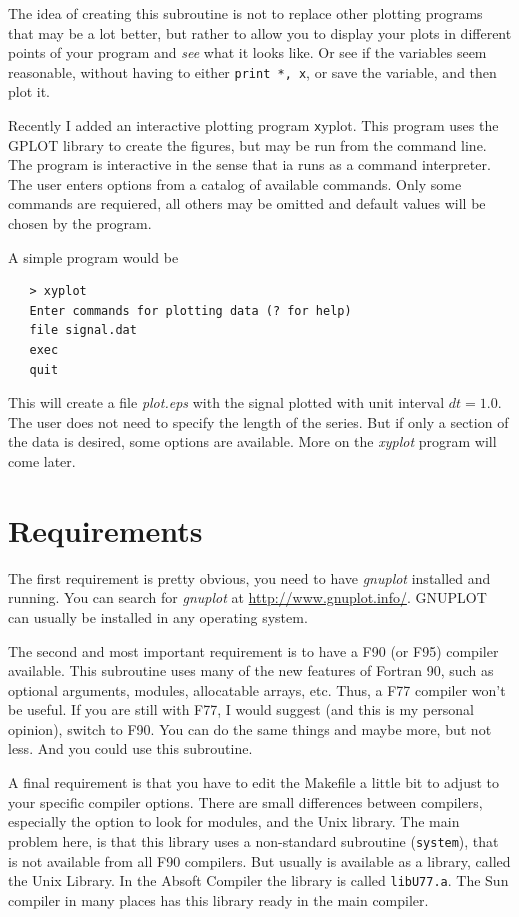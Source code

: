 \documentclass{article}
\begin{document}
The idea of creating this subroutine is not to replace other plotting programs that may be a lot better, but rather to allow you to display your plots in different points of your program and {\it see} what it looks like. Or see if the variables seem reasonable, without having to either \texttt{print *, x}, or save the variable, and then plot it.

Recently I added an interactive plotting program {\texttt xyplot}. This program uses the GPLOT library to create the figures, but may be run from the command line. The program is interactive in the sense that ia runs as a command interpreter. The user enters options from a catalog of available commands. Only some commands are requiered, all others may be omitted and default values will be chosen by the program. 

\noindent A simple program would be

\begin{verbatim}
   > xyplot
   Enter commands for plotting data (? for help)
   file signal.dat
   exec
   quit
\end{verbatim}
This will create a file {\it plot.eps} with the signal plotted with unit interval $dt=1.0$. The user does not need to specify the length of the series. But if only a section of the data is desired, some options are available. More on the {\it xyplot} program will come later.

\section{Requirements}
The first requirement is pretty obvious, you need to have {\it gnuplot} installed and running. You can search for {\it gnuplot} at \underline{http://www.gnuplot.info/}. GNUPLOT can usually be installed in any operating system. 

The second and most important requirement is to have a F90 (or F95) compiler available. This subroutine uses many of the new features of Fortran 90, such as optional arguments, modules, allocatable arrays, etc. Thus, a F77 compiler won't be useful. If you are still with F77, I would suggest (and this is my personal opinion), switch to F90. You can do the same things and maybe more, but not less. And you could use this subroutine. 

A final requirement is that you have to edit the Makefile a little bit to adjust to your specific compiler options.  
There are small differences between compilers, especially the option to look for modules, and the Unix library. The main problem here, is that this library uses a non-standard subroutine (\texttt{system}), that is not available from all F90 compilers. But usually is available as a library, called the Unix Library. In the Absoft Compiler the library is called \texttt{libU77.a}. The Sun compiler in many places has this library ready in the main compiler. 
\end{document}
